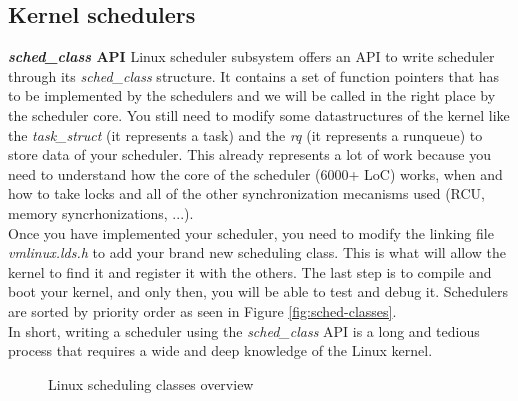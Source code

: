 \subsection{Kernel schedulers}

\textbf{\textit{sched\_class} API} Linux scheduler subsystem offers an API to write scheduler through its \textit{sched\_class} structure. It contains a set of function pointers that has to be implemented by the schedulers and we will be called in the right place by the scheduler core. You still need to modify some datastructures of the kernel like the \textit{task\_struct} (it represents a task) and the \textit{rq} (it represents a runqueue) to store data of your scheduler. This already represents a lot of work because you need to understand how the core of the scheduler (6000+ LoC) works, when and how to take locks and all of the other synchronization mecanisms used (RCU, memory syncrhonizations, ...). \\ Once you have implemented your scheduler, you need to modify the linking file \textit{vmlinux.lds.h} to add your brand new scheduling class. This is what will allow the kernel to find it and register it with the others. The last step is to compile and boot your kernel, and only then, you will be able to test and debug it. Schedulers are sorted by priority order as seen in Figure \ref{fig:sched-classes}.\\ 
In short, writing a scheduler using the \textit{sched\_class} API is a long and tedious process that requires a wide and deep knowledge of the Linux kernel. 

\begin{figure}[htbp]
        \centering
        
        \caption{Linux scheduling classes overview}
\end{figure}



